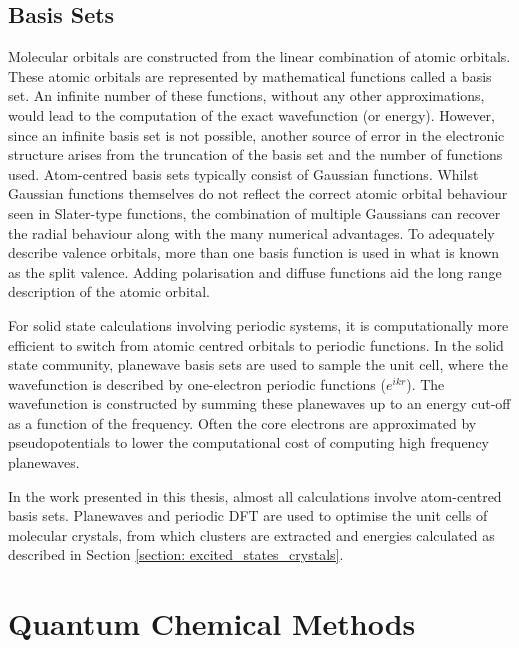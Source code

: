\subsection{Basis Sets}\label{section: methods_basisets}
Molecular orbitals are constructed from the linear combination of atomic orbitals. These atomic orbitals are represented by mathematical functions called a basis set. An infinite number of these functions, without any other approximations, would lead to the computation of the exact wavefunction (or energy). However, since an infinite basis set is not possible, another source of error in the electronic structure arises from the truncation of the basis set and the number of functions used. Atom-centred basis sets typically consist of Gaussian functions. Whilst Gaussian functions themselves do not reflect the correct atomic orbital behaviour seen in Slater-type functions, the combination of multiple Gaussians can recover the radial behaviour along with the many numerical advantages. To adequately describe valence orbitals, more than one basis function is used in what is known as the split valence. Adding polarisation and diffuse functions aid the long range description of the atomic orbital.

For solid state calculations involving periodic systems, it is computationally more efficient to switch from atomic centred orbitals to periodic functions. In the solid state community, planewave basis sets are used to sample the unit cell, where the wavefunction is described by one-electron periodic functions ($e^{ikr}$). The wavefunction is constructed by summing these planewaves up to an energy cut-off as a function of the frequency. Often the core electrons are approximated by pseudopotentials to lower the computational cost of computing high frequency planewaves. 

In the work presented in this thesis, almost all calculations involve atom-centred basis sets. Planewaves and periodic DFT are used to optimise the unit cells of molecular crystals, from which clusters are extracted and energies calculated as described in Section \ref{section: excited_states_crystals}. 

\section{Quantum Chemical Methods}\label{section: methods}
